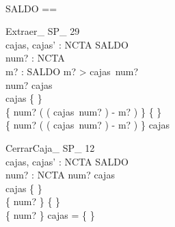  \begin{zed}
[NCTA] \\
SALDO == \nat
\end{zed}

\begin{schema}{Extraer\_ SP\_ 29}\\
 cajas, cajas' : NCTA \pfun SALDO \\
 num? : NCTA \\
 m? : SALDO 
\where
 m? > cajas~num? \\
 num? \in \dom cajas \\
 cajas \neq \{ \} \\
 \{ num? \mapsto ( ( cajas~num? ) - m? ) \} \neq \{ \} \\
 \dom \{ num? \mapsto ( ( cajas~num? ) - m? ) \} \subset \dom cajas
\end{schema}

\begin{schema}{CerrarCaja\_ SP\_ 12}\\
 cajas, cajas' : NCTA \pfun SALDO \\
 num? : NCTA 
\where
 num? \notin \dom cajas \\
 cajas \neq \{ \} \\
 \{ num? \} \neq \{ \} \\
 \{ num? \} \cap \dom cajas = \{ \}
\end{schema}


